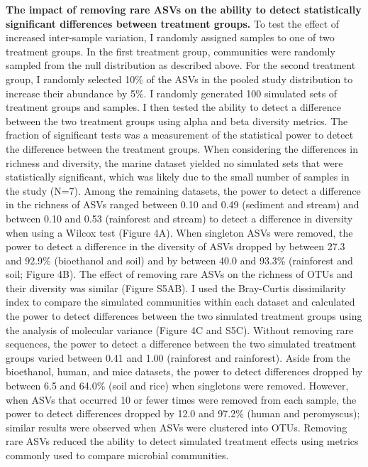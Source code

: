 \documentclass[
]{article}
\begin{document}
\textbf{The impact of removing rare ASVs on the ability to detect
statistically significant differences between treatment groups.} To test
the effect of increased inter-sample variation, I randomly assigned
samples to one of two treatment groups. In the first treatment group,
communities were randomly sampled from the null distribution as
described above. For the second treatment group, I randomly selected
10\% of the ASVs in the pooled study distribution to increase their
abundance by 5\%. I randomly generated 100 simulated sets of treatment
groups and samples. I then tested the ability to detect a difference
between the two treatment groups using alpha and beta diversity metrics.
The fraction of significant tests was a measurement of the statistical
power to detect the difference between the treatment groups. When
considering the differences in richness and diversity, the marine
dataset yielded no simulated sets that were statistically significant,
which was likely due to the small number of samples in the study (N=7).
Among the remaining datasets, the power to detect a difference in the
richness of ASVs ranged between 0.10 and 0.49 (sediment and stream) and
between 0.10 and 0.53 (rainforest and stream) to detect a difference in
diversity when using a Wilcox test (Figure 4A). When singleton ASVs were
removed, the power to detect a difference in the diversity of ASVs
dropped by between 27.3 and 92.9\% (bioethanol and soil) and by between
40.0 and 93.3\% (rainforest and soil; Figure 4B). The effect of removing
rare ASVs on the richness of OTUs and their diversity was similar
(Figure S5AB). I used the Bray-Curtis dissimilarity index to compare the
simulated communities within each dataset and calculated the power to
detect differences between the two simulated treatment groups using the
analysis of molecular variance (Figure 4C and S5C). Without removing
rare sequences, the power to detect a difference between the two
simulated treatment groups varied between 0.41 and 1.00 (rainforest and
rainforest). Aside from the bioethanol, human, and mice datasets, the
power to detect differences dropped by between 6.5 and 64.0\% (soil and
rice) when singletons were removed. However, when ASVs that occurred 10
or fewer times were removed from each sample, the power to detect
differences dropped by 12.0 and 97.2\% (human and peromyscus); similar
results were observed when ASVs were clustered into OTUs. Removing rare
ASVs reduced the ability to detect simulated treatment effects using
metrics commonly used to compare microbial communities.
\end{document}
